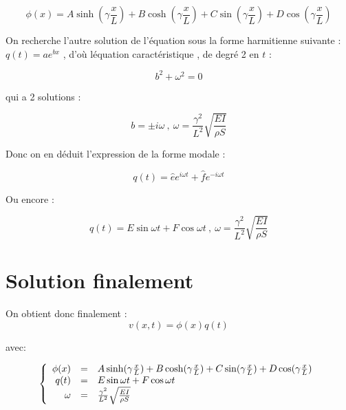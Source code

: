 \documentclass[a4paper,10pt]{report} %
\begin{document}
\begin{equation}
    \phi (x)=A\sinh{(\gamma\frac{x}{L})}+B\cosh{(\gamma\frac{x}{L})}+C\sin{(\gamma\frac{x}{L})}+D\cos{(\gamma\frac{x}{L})}
    \label{equation9}
\end{equation}

On recherche l'autre solution de l'équation sous la forme harmitienne suivante : 
$q(t)=ae^{bx}$ , d'où léquation caractéristique , de degré 2 en $t$ :

\begin{equation}
    b^2+\omega^2=0
    \label{equation10}
\end{equation}

qui a 2 solutions :

\begin{equation}
    b=\pm i\omega\ , \ \omega=\frac{\gamma^2}{L^2}\sqrt{\frac{EI}{\rho S}}
    \label{equation11}
\end{equation}

Donc on en déduit l'expression de la forme modale :

\begin{equation}
    q(t)=\hat{e}e^{i\omega t}+\hat{f}e^{-i\omega t}
    \label{equation12}
\end{equation}

Ou encore :

\begin{equation}
    q(t)=E\sin{\omega t}+F\cos{\omega t}\ , \ \omega=\frac{\gamma^2}{L^2}\sqrt{\frac{EI}{\rho S}}
    \label{equation13}
\end{equation}


\section{Solution finalement}
On obtient donc finalement :
\begin{equation}
	v(x,t)=\phi (x)q(t)
	\label{equation15}
\end{equation}

avec:


\begin{equation}
    \left\{
    \begin{array}{r c l}
        \phi(x)&=&A\sinh(\gamma\frac{x}{L})+B\cosh(\gamma\frac{x}{L})+C\sin(\gamma\frac{x}{L})+D\cos(\gamma\frac{x}{L})\\q(t)&=&E\sin{\omega t}+F\cos{\omega t}\\
        \omega&=&\frac{\gamma^2}{L^2}\sqrt{\frac{EI}{\rho S}}
    \end{array}
    \right.
\end{equation}
\end{document}
